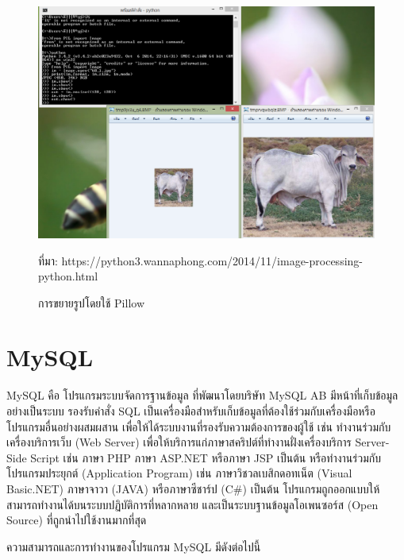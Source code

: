 			\begin{figure}[H]
				\includegraphics[width=\columnwidth]{Figures/insect2/pillow}
				\caption{การขยายรูปโดยใช้ Pillow}{ที่มา: https://python3.wannaphong.com/2014/11/image-processing-python.html}
				\label{Fig:pillow} 
			\end{figure}
		\section{MySQL}
		MySQL  คือ โปรแกรมระบบจัดการฐานข้อมูล ที่พัฒนาโดยบริษัท MySQL AB มีหน้าที่เก็บข้อมูลอย่างเป็นระบบ รองรับคำสั่ง SQL เป็นเครื่องมือสำหรับเก็บข้อมูลที่ต้องใช้ร่วมกับเครื่องมือหรือโปรแกรมอื่นอย่างผสมผสาน เพื่อให้ได้ระบบงานที่รองรับความต้องการของผู้ใช้ เช่น ทำงานร่วมกับเครื่องบริการเว็บ (Web Server) เพื่อให้บริการแก่ภาษาสคริปต์ที่ทำงานฝั่งเครื่องบริการ Server-Side Script เช่น ภาษา PHP ภาษา ASP.NET หรือภาษา JSP เป็นต้น หรือทำงานร่วมกับโปรแกรมประยุกต์ (Application Program) เช่น ภาษาวิชวลเบสิกดอทเน็ต (Visual Basic.NET) ภาษาจาวา (JAVA) หรือภาษาซีชาร์ป (C\#) เป็นต้น โปรแกรมถูกออกแบบให้สามารถทำงานได้บนระบบปฏิบัติการที่หลากหลาย และเป็นระบบฐานข้อมูลโอเพนซอร์ส (Open Source) ที่ถูกนำไปใช้งานมากที่สุด
		
		ความสามารถและการทำงานของโปรแกรม MySQL มีดังต่อไปนี้ 
		
